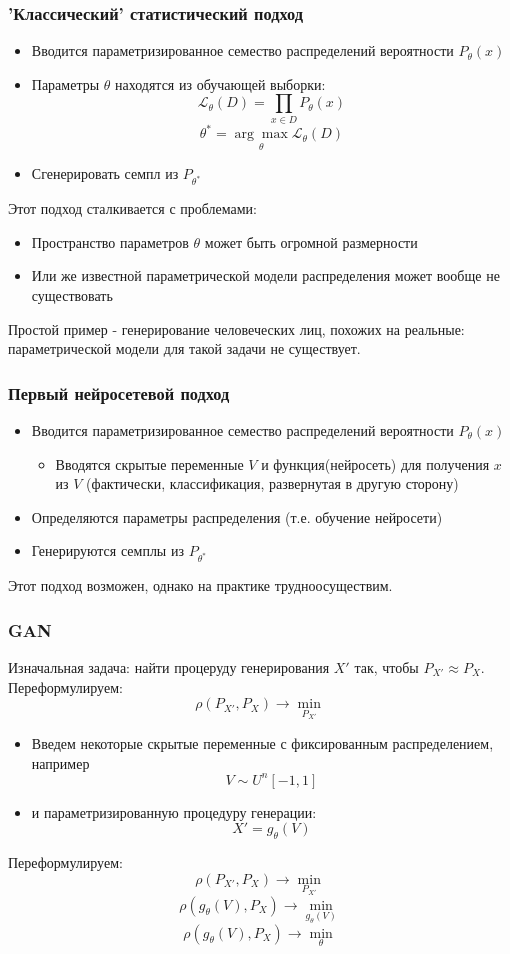 \documentclass[9pt]{beamer}
\begin{document}
\begin{frame}\frametitle{'Классический' статистический подход}
	\begin{itemize}
		\item Вводится параметризированное семество распределений вероятности $P_{\theta}(x)$
		\item Параметры $\theta$ находятся из обучающей выборки:
		$$ \mathcal{L}_{\theta}(D) = \prod_{x \in D} P_{\theta}(x) $$
		$$ \theta^{*} = \underset{\theta}{\arg\max} \mathcal{L}_{\theta}(D)$$
		\item Сгенерировать семпл из $ P_{\theta^{*}}$
	\end{itemize}
	Этот подход сталкивается с проблемами:
	\begin{itemize}
		\item Пространство параметров $\theta$ может быть огромной размерности
		\item Или же известной параметрической модели распределения может вообще не существовать
	\end{itemize}
	Простой пример - генерирование человеческих лиц, похожих на реальные: параметрической модели для такой задачи не существует.
\end{frame}

\begin{frame}\frametitle{Первый нейросетевой подход}
	\begin{itemize}
		\item Вводится параметризированное семество распределений вероятности $P_{\theta}(x)$
		\begin{itemize}
			\item Вводятся скрытые переменные $V$ и функция(нейросеть) для получения $x$ из $V$ (фактически, классификация, развернутая в другую сторону)
		\end{itemize}
		\item Определяются параметры распределения (т.е. обучение нейросети)
		\item Генерируются семплы из $ P_{\theta^{*}}$
	\end{itemize}
	Этот подход возможен, однако на практике трудноосуществим.
\end{frame}

\begin{frame}\frametitle{GAN}
	Изначальная задача: найти процеруду генерирования $X'$ так, чтобы $ P_{X'} \approx P_X$.
	Переформулируем:
	$$ \rho(P_{X'}, P_X) \longrightarrow \underset{P_{X'}}{\min} $$
	\begin{itemize}
		\item Введем некоторые скрытые переменные с фиксированным распределением, например
		$$ V \sim U^n [-1, 1] $$
		\item и параметризированную процедуру генерации:
		$$ X' = g_{\theta}(V) $$
	\end{itemize}
	Переформулируем:
	$$ \rho(P_{X'}, P_X) \longrightarrow \underset{P_{X'}}{\min} $$
	$$ \rho(g_{\theta}(V), P_X) \longrightarrow \underset{g_{\theta}(V)}{\min} $$
	$$ \rho(g_{\theta}(V), P_X) \longrightarrow \underset{\theta}{\min} $$
\end{frame}
\end{document}
